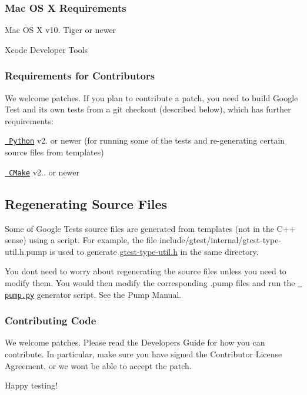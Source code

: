 \subsubsection*{Mac OS X Requirements}


\begin{DoxyItemize}
\item Mac OS X v10. Tiger or newer
\item Xcode Developer Tools
\end{DoxyItemize}

\subsubsection*{Requirements for Contributors}

We welcome patches. If you plan to contribute a patch, you need to build Google Test and its own tests from a git checkout (described below), which has further requirements\+:


\begin{DoxyItemize}
\item \href{https://www.python.org/}\texttt{ Python} v2. or newer (for running some of the tests and re-\/generating certain source files from templates)
\item \href{https://cmake.org/}\texttt{ C\+Make} v2.. or newer
\end{DoxyItemize}

\subsection*{Regenerating Source Files}

Some of Google Test\textquotesingle{}s source files are generated from templates (not in the C++ sense) using a script. For example, the file include/gtest/internal/gtest-\/type-\/util.\+h.\+pump is used to generate \mbox{\hyperlink{gtest-type-util_8h_source}{gtest-\/type-\/util.\+h}} in the same directory.

You don\textquotesingle{}t need to worry about regenerating the source files unless you need to modify them. You would then modify the corresponding {\ttfamily .pump} files and run the \textquotesingle{}\href{googletest/scripts/pump.py}\texttt{ pump.\+py}\textquotesingle{} generator script. See the Pump Manual.

\subsubsection*{Contributing Code}

We welcome patches. Please read the Developer\textquotesingle{}s Guide for how you can contribute. In particular, make sure you have signed the Contributor License Agreement, or we won\textquotesingle{}t be able to accept the patch.

Happy testing! 